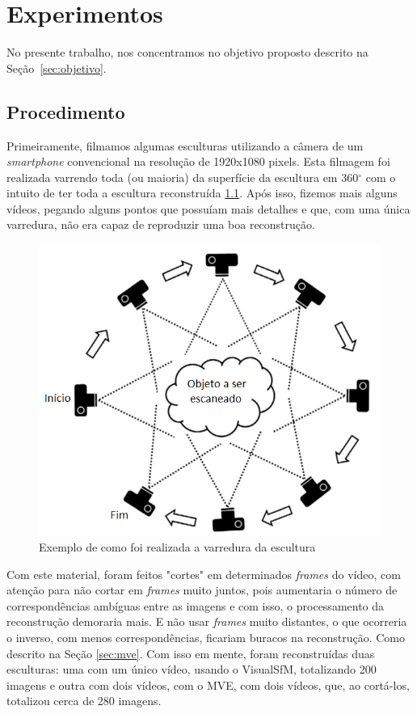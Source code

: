 \chapter{Experimentos}\label{sec:experiments}
No presente trabalho, nos concentramos no objetivo proposto descrito na Seção~\ref{sec:objetivo}.

\section {Procedimento}
Primeiramente, filmamos algumas esculturas utilizando a câmera de um {\it smartphone} convencional na resolução de 1920x1080 pixels. Esta filmagem foi realizada varrendo toda (ou maioria) da superfície da escultura em 360$^{\circ}$ com o intuito de ter toda a escultura reconstruída \ref{fig:procedimentoscan}.
Após isso, fizemos mais alguns vídeos, pegando alguns pontos que possuíam mais detalhes e que, com uma única varredura, não era capaz de reproduzir uma boa reconstrução.

\begin{figure}[!h]
	\centering
	\includegraphics[width=0.5\linewidth]{figs/procedimentoscan.png}
	\caption{%
	Exemplo de como foi realizada a varredura da escultura
	}\label{fig:procedimentoscan}
\end{figure}

Com este material, foram feitos "cortes" em determinados {\it frames} do vídeo, com atenção para não cortar em {\it frames} muito juntos, pois aumentaria o número de correspondências ambíguas entre as imagens e com isso, o processamento da reconstrução demoraria mais. E não usar {\it frames} muito distantes, o que ocorreria o inverso, com menos correspondências, ficariam buracos na reconstrução. Como descrito na Seção \ref{sec:mve}.
Com isso em mente, foram reconstruídas duas esculturas: uma com um único vídeo, usando o VisualSfM, totalizando 200 imagens e outra com dois vídeos, com o MVE, com dois vídeos, que, ao cortá-los, totalizou cerca de 280 imagens.

